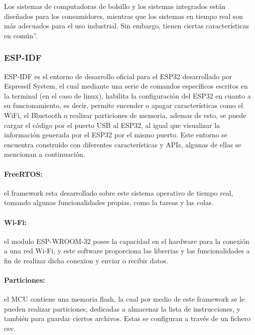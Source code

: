 Los sistemas de computadoras de bolsillo y los sistemas integrados están diseñados para los consumidores, mientras que los sistemas en tiempo real son más adecuados para el uso industrial. Sin embargo, tienen ciertas características en común''. \cite{SO}

\subsubsection{ESP-IDF}

ESP-IDF es el entorno de desarrollo oficial para el ESP32 desarrollado por Espressif System, el cual mediante una serie de comandos específicos escritos en la terminal (en el caso de linux), habilita la configuración del ESP32 en cuanto a su funcionamiento, es decir, permite encender o apagar características como el WiFi, el Bluetooth o realizar particiones de memoria, ademas de esto, se puede cargar el código por el puerto USB al ESP32, al igual que visualizar la información generada por el ESP32 por el mismo puerto. Este entorno se encuentra construido con diferentes características y APIs, algunas de ellas se mencionan a continuación. \cite{ES}

\paragraph{FreeRTOS:}el framework esta desarrollado sobre este sistema operativo de tiempo real, tomando algunas funcionalidades propias, como la tareas y las colas.

\paragraph{Wi-Fi:}el modulo ESP-WROOM-32 posee la capacidad en el hardware para la conexión a una red Wi-Fi, y este software proporciona las librerias y las funcionalidades a fin de realizar dicha conexion y enviar o recibir datos.

\paragraph{Particiones:}el MCU contiene una memoria flash, la cual por medio de este framework se le pueden realizar particiones, dedicadas a almacenar la lista de instrucciones, y también para guardar ciertos archivos. Estas se configuran a través de un fichero csv.


